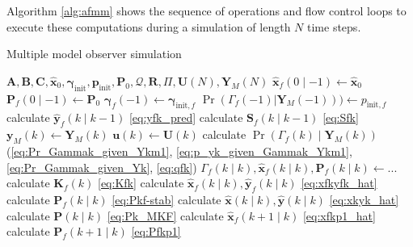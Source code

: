 {Algorithm \ref{alg:afmm} shows the sequence of operations and flow control loops to execute these computations during a simulation of length $N$ time steps.
%
\begin{algorithm}
	\caption{Multiple model observer simulation}  \label{alg:afmm}
	\begin{algorithmic}
			\Require $\mathbf{A}, \mathbf{B}, \mathbf{C}, \mathbf{\hat{x}}_0, \mathbf{\gamma}_{\text{init}}, \mathbf{p}_{\text{init}}, \mathbf{P}_0, \mathcal{Q}, \mathbf{R}, \Pi, \mathbf{U}(N), \mathbf{Y}_M(N)$
				\State $\mathbf{\hat{x}}_f(0 \mid -1) \gets \mathbf{\hat{x}}_0$
				\State $\mathbf{P}_f(0 \mid -1) \gets \mathbf{P}_0$
				\State $\mathbf{\gamma}_f(-1) \gets \mathbf{\gamma}_{\text{init},f}$
				\State $\Pr(\Gamma_f(-1)|\mathbf{Y}_M(-1))) \gets p_{\text{init},f}$
			\EndFor
				\State calculate $\mathbf{\hat{y}}_f(k \mid k-1)$ \eqref{eq:yfk_pred} 
				\State calculate $\mathbf{S}_f(k \mid k-1)$ \eqref{eq:Sfk}
			\EndFor
			\State $\mathbf{y}_M(k) \gets \mathbf{Y}_M(k)$   %
			\State $\mathbf{u}(k) \gets \mathbf{U}(k)$
				\State calculate $\Pr(\Gamma_f(k) \mid \mathbf{Y}_M(k))$ (\ref{eq:Pr_Gammak_given_Ykm1}, \ref{eq:p_yk_given_Gammak_Ykm1}, \ref{eq:Pr_Gammak_given_Yk}, \ref{eq:qfk})       %
			\EndFor
			\State $\Gamma_f(k \mid k), \mathbf{\hat{x}}_f(k \mid k), \mathbf{P}_f(k \mid k) \gets ...$   %
				\State calculate $\mathbf{K}_f(k)$ \eqref{eq:Kfk} 
				\State calculate $\mathbf{\hat{x}}_f(k \mid k), \mathbf{\hat{y}}_f(k \mid k)$ \eqref{eq:xfkyfk_hat}
				\State calculate $\mathbf{P}_f(k \mid k)$ \eqref{eq:Pkf-stab}
			\EndFor
			\State calculate $\mathbf{\hat{x}}(k \mid k), \mathbf{\hat{y}}(k \mid k)$ \eqref{eq:xkyk_hat} 
			\State calculate $\mathbf{P}(k \mid k)$ \eqref{eq:Pk_MKF}   %
				\State calculate $\mathbf{\hat{x}}_f(k+1 \mid k)$ \eqref{eq:xfkp1_hat} 
				\State calculate $\mathbf{P}_f(k+1 \mid k)$ \eqref{eq:Pfkp1}
			\EndFor
			\EndFor
		\end{algorithmic}
\end{algorithm}

}

